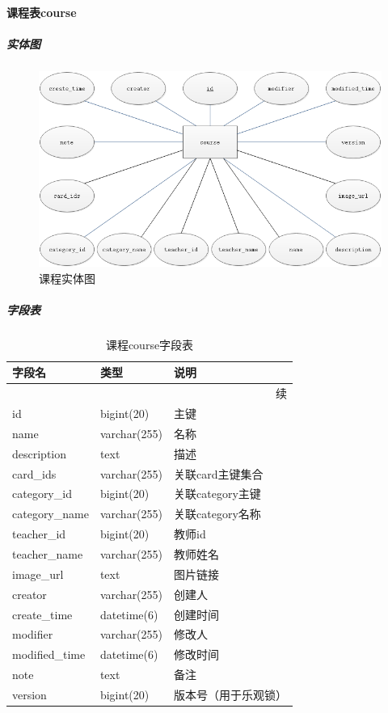 \documentclass[titlepage,UTF8,linespread=1.5]{ctexart}
\begin{document}
\paragraph{课程表course}
\subparagraph{实体图}
\begin{figure}[H]
    \centering
    \includegraphics[width=140mm]{entity-course.png}
    \caption{课程实体图}
    \label{fig:entity-course}
\end{figure}
\subparagraph{字段表}
\begin{longtable}{|p{10em}|p{6em}|p{15em}|}
    \caption{课程course字段表}\label{tab:table_course}   \\\hline
    字段名         & 类型         & 说明                 \\\hline
    \endfirsthead
    \multicolumn{3}{r}{{续\tablename\thetable{}}}        \\\hline
    \endhead
    id             & bigint(20)   & 主键                 \\\hline
    name           & varchar(255) & 名称                 \\\hline
    description    & text         & 描述                 \\\hline
    card\_ids      & varchar(255) & 关联card主键集合     \\\hline
    category\_id   & bigint(20)   & 关联category主键     \\\hline
    category\_name & varchar(255) & 关联category名称     \\\hline
    teacher\_id    & bigint(20)   & 教师id               \\\hline
    teacher\_name  & varchar(255) & 教师姓名             \\\hline
    image\_url     & text         & 图片链接             \\\hline
    creator        & varchar(255) & 创建人               \\\hline
    create\_time   & datetime(6)  & 创建时间             \\\hline
    modifier       & varchar(255) & 修改人               \\\hline
    modified\_time & datetime(6)  & 修改时间             \\\hline
    note           & text         & 备注                 \\\hline
    version        & bigint(20)   & 版本号（用于乐观锁） \\\hline
\end{longtable}\par
\end{document}
